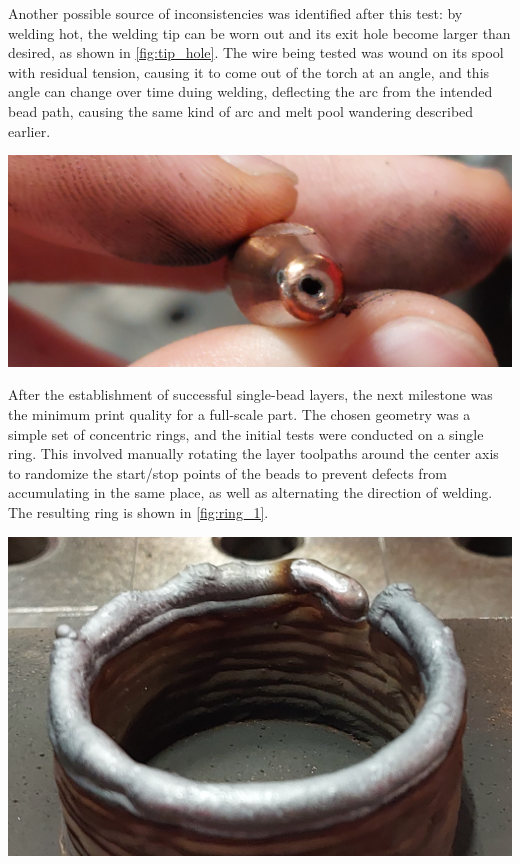 Another possible source of inconsistencies was identified after this test: by welding hot, the welding tip can be worn out and its exit hole become larger than desired, as shown in \autoref{fig:tip_hole}. The wire being tested was wound on its spool with residual tension, causing it to come out of the torch at an angle, and this angle can change over time duing welding, deflecting the arc from the intended bead path, causing the same kind of arc and melt pool wandering described earlier.

\begin{minipage}{\linewidth}
    \centering
    \includegraphics[width=\linewidth]{images/tip_hole.jpg}
    \label{fig:tip_hole}
\end{minipage}

After the establishment of successful single-bead layers, the next milestone was the minimum print quality for a full-scale part. The chosen geometry was a simple set of concentric rings, and the initial tests were conducted on a single ring.
This involved manually rotating the layer toolpaths around the center axis to randomize the start/stop points of the beads to prevent defects from accumulating in the same place, as well as alternating the direction of welding. The resulting ring is shown in \autoref{fig:ring_1}.

\begin{minipage}{\linewidth}
    \centering
    \includegraphics[width=\linewidth]{images/ring_1.jpg}
    \label{fig:ring_1}
\end{minipage}

